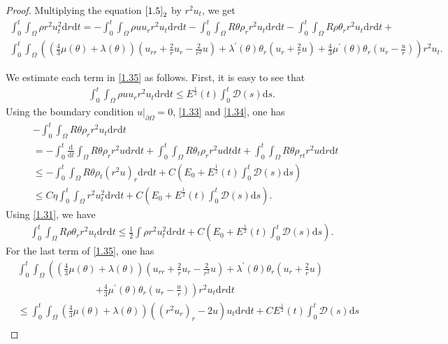 \documentclass[11pt,reqno]{amsart}
\numberwithin{equation}{section}
\newcommand{\dif}{\mathrm{d}}
\newcommand{\intx}{\int_0^t \int_{\Omega} }
\begin{document}
\begin{proof}
Multiplying the equation $\eqref{1.5}_2$ by $r^2 u_t$, we get{\small
\begin{align}\label{1.35}
\intx \rho r^2 u_t^2 \dif r\dif t=-\intx \rho u u_r r^2 u_t \dif r\dif t-\intx R \theta \rho_r r^2 u_t \dif r \dif t-\intx R \rho \theta_r r^2 u_t \dif r\dif t +\nonumber\\
\intx \left(\left(\frac{4}{3} \mu(\theta)+\lambda(\theta)\right)\left(u_{rr}+\frac{2}{r}u_r-\frac{2}{r^2} u\right)+\lambda^\prime(\theta)\theta_r\left(u_r+\frac{2}{r}u\right)+\frac{4}{3}\mu^\prime(\theta) \theta_r\left(u_r-\frac{u}{r}\right) \right)r^2 u_t.
\end{align}}

We estimate each term in \eqref{1.35} as follows.
First,  it is easy to see that
\begin{align*}
\intx \rho u u_r r^2 u_t \dif r \dif t \le  E^\frac{1}{2}(t) \int_0^t  \mathcal D(s)\dif s.
\end{align*}
Using the boundary condition $u|_{\partial \Omega}=0$, \eqref{1.33} and \eqref{1.34}, one has
\begin{align*}
&-\intx R\theta \rho_r r^2 u_t \dif r\dif t \\
&=-\int_0^t \frac{\dif}{\dif t} \int_{\Omega} R \theta \rho_r r^2 u \dif r \dif t +\intx R\theta_t \rho_r r^2 u \dif t \dif t +\intx R \theta \rho_{rt} r^2 u\dif r \dif t \\
&\le -\intx R\theta \rho_t (r^2 u)_r\dif r \dif t+C(E_0+E^\frac{1}{2}(t) \int_0^t  \mathcal D(s)\dif s)\\
&\le C \eta \intx r^2 u_t^2 \dif r \dif t +C(E_0+E^\frac{1}{2}(t) \int_0^t  \mathcal D(s)\dif s).
\end{align*}
Using \eqref{1.31}, we have
\begin{align*}
\intx R \rho \theta_r r^2 u_t \dif r \dif t \le \frac{1}{2} \int \rho  r^2 u_t^2 \dif r \dif t+C(E_0+E^\frac{1}{2}(t) \int_0^t  \mathcal D(s)\dif s).
\end{align*}
For the last term of \eqref{1.35}, one has
\begin{align*}
&\intx \left(\left(\frac{4}{3} \mu(\theta)+\lambda(\theta)\right)\left(u_{rr}+\frac{2}{r}u_r-\frac{2}{r^2} u\right)+\lambda^\prime(\theta)\theta_r\left(u_r+\frac{2}{r}u\right)\right.\\
&\qquad\qquad\qquad\qquad\left.+\frac{4}{3}\mu^\prime(\theta) \theta_r\left(u_r-\frac{u}{r}\right) \right)r^2 u_t \dif r \dif t\\
&\le \intx \left(\frac{4}{3} \mu(\theta)+\lambda(\theta)\right)\left((r^2u_r)_r-2u\right)u_t \dif r \dif t +CE^\frac{1}{2}(t) \int_0^t  \mathcal D(s)\dif s\\

\end{align*}
\end{proof}
\end{document}

